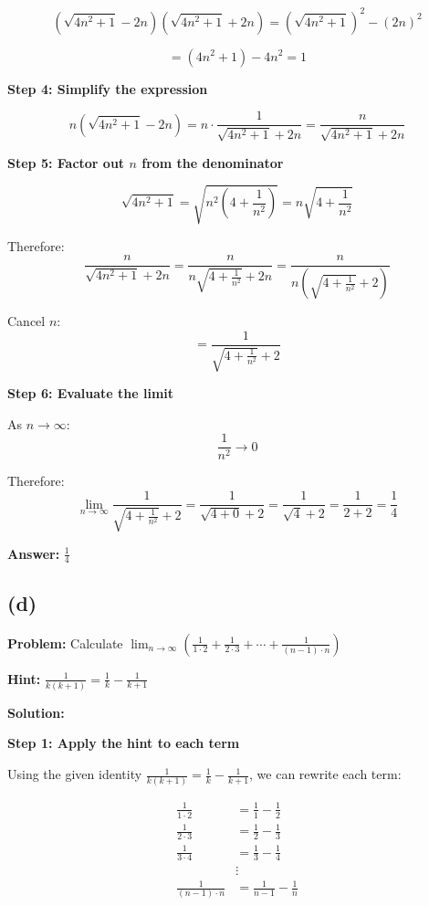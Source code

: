 \documentclass[12pt,a4paper]{article}
\theoremstyle{definition}
\theoremstyle{remark}
\begin{document}
$$(\sqrt{4n^2 + 1} - 2n)(\sqrt{4n^2 + 1} + 2n) = (\sqrt{4n^2 + 1})^2 - (2n)^2$$

$$= (4n^2 + 1) - 4n^2 = 1$$

\textbf{Step 4: Simplify the expression}

$$n\left(\sqrt{4n^2 + 1} - 2n\right) = n \cdot \frac{1}{\sqrt{4n^2 + 1} + 2n} = \frac{n}{\sqrt{4n^2 + 1} + 2n}$$

\textbf{Step 5: Factor out $n$ from the denominator}

$$\sqrt{4n^2 + 1} = \sqrt{n^2(4 + \frac{1}{n^2})} = n\sqrt{4 + \frac{1}{n^2}}$$

Therefore:
$$\frac{n}{\sqrt{4n^2 + 1} + 2n} = \frac{n}{n\sqrt{4 + \frac{1}{n^2}} + 2n} = \frac{n}{n\left(\sqrt{4 + \frac{1}{n^2}} + 2\right)}$$

Cancel $n$:
$$= \frac{1}{\sqrt{4 + \frac{1}{n^2}} + 2}$$

\textbf{Step 6: Evaluate the limit}

As $n \to \infty$:
$$\frac{1}{n^2} \to 0$$

Therefore:
$$\lim_{n \to \infty} \frac{1}{\sqrt{4 + \frac{1}{n^2}} + 2} = \frac{1}{\sqrt{4 + 0} + 2} = \frac{1}{\sqrt{4} + 2} = \frac{1}{2 + 2} = \frac{1}{4}$$

\textbf{Answer:} $\boxed{\frac{1}{4}}$


\subsection*{(d)}
\textbf{Problem:} Calculate $\lim_{n \to \infty} \left(\frac{1}{1 \cdot 2} + \frac{1}{2 \cdot 3} + \cdots + \frac{1}{(n-1) \cdot n}\right)$

\textbf{Hint:} $\frac{1}{k(k+1)} = \frac{1}{k} - \frac{1}{k+1}$

\textbf{Solution:}

\textbf{Step 1: Apply the hint to each term}

Using the given identity $\frac{1}{k(k+1)} = \frac{1}{k} - \frac{1}{k+1}$, we can rewrite each term:

\begin{align}
\frac{1}{1 \cdot 2} &= \frac{1}{1} - \frac{1}{2}\\
\frac{1}{2 \cdot 3} &= \frac{1}{2} - \frac{1}{3}\\
\frac{1}{3 \cdot 4} &= \frac{1}{3} - \frac{1}{4}\\
&\vdots\\
\frac{1}{(n-1) \cdot n} &= \frac{1}{n-1} - \frac{1}{n}
\end{align}
\end{document}
